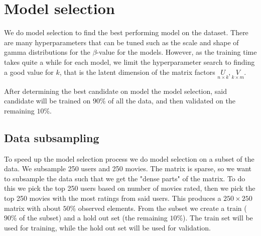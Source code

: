 \documentclass[12pt]{article}
\begin{document}
\section{Model selection}
We do model selection to find the best performing model on the dataset. There are many hyperparameters that can be tuned such as the scale and shape of gamma distributions for the $\beta$-value for the models. However, as the training time takes quite a while for each model, we limit the hyperparameter search to finding a good value for $k$, that is the latent dimension of the matrix factors $\underset{n \times k}{U}, \underset{k \times m}{V}$. 

After determining the best candidate on model the model selection, said candidate will be trained on $90\%$ of all the data, and then validated on the remaining $10\%$.

    \subsection{Data subsampling}
    To speed up the model selection process we do model selection on a subset of the data. We subsample 250 users and 250 movies. The matrix is sparse, so we want to subsample the data such that we get the "dense parts" of the matrix. To do this we pick the top 250 users based on number of movies rated, then we pick the top 250 movies with the most ratings from said users. This produces a $250 \times 250$ matrix with about $50\%$ observed elements. From the subset we create a train ($90\%$ of the subset) and a hold out set (the remaining $10\%$). The train set will be used for training, while the hold out set will be used for validation.
\end{document}
